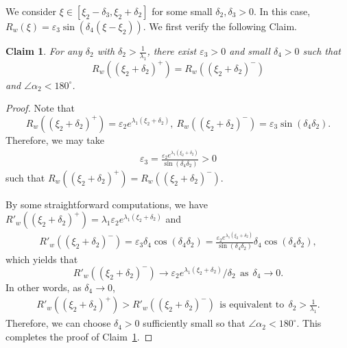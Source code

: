 \documentclass[11pt,a4paper]{article}
\newtheorem{claim}[theorem]{\textbf{Claim}}
\numberwithin{equation}{section}
\numberwithin{figure}{section}
\newcommand\bea{\begin{eqnarray}}
\newcommand\eea{\end{eqnarray}}
\newcommand\beaa{\begin{eqnarray*}}
\newcommand\eeaa{\end{eqnarray*}}
\begin{document}
\medskip





 We consider $\xi\in[\xi_2-\delta_3,\xi_2+\delta_2]$ for some small $\delta_2,\delta_3>0$. In this case, $R_w(\xi)=\varepsilon_3\sin(\delta_4(\xi-\xi_2))$.
We first verify the following Claim.
\begin{claim}\label{cl scalar}
For any $\delta_2$ with $\delta_2>\frac{1}{\lambda_1}$, there exist
$\varepsilon_3>0$ and small $\delta_4>0$
such that 
$$R_w((\xi_2+\delta_2)^+)=R_w((\xi_2+\delta_2)^-)$$ 
and $\angle\alpha_2<180^{\circ}$.
\end{claim}
\begin{proof}
Note that 
$$R_w((\xi_2+\delta_2)^+)=\varepsilon_2e^{\lambda_1(\xi_2+\delta_2)},\ R_w((\xi_2+\delta_2)^-)=\varepsilon_3\sin(\delta_4\delta_2).$$
Therefore, we may take
\bea\label{epsilon 3}
\varepsilon_3= \frac{\varepsilon_2e^{\lambda_1(\xi_2+\delta_2)}}{\sin(\delta_4\delta_2)}>0
\eea
such that $R_w((\xi_2+\delta_2)^+)=R_w((\xi_2+\delta_2)^-)$.

By some  straightforward computations, we have
$R'_w((\xi_2+\delta_2)^+)=\lambda_1\varepsilon_2e^{\lambda_1(\xi_2+\delta_2)}$ and
\beaa
R'_w((\xi_2+\delta_2)^-)=\varepsilon_3\delta_4\cos(\delta_4\delta_2)=\frac{\varepsilon_2e^{\lambda_1(\xi_2+\delta_2)}}{\sin(\delta_4\delta_2)}\delta_4\cos(\delta_4\delta_2),
\eeaa
which yields that
$$R'_w((\xi_2+\delta_2)^-)\rightarrow \varepsilon_2e^{\lambda_1(\xi_2+\delta_2)}/\delta_2\ \ \text{as}\ \ \delta_4\to0.$$
In other words, as $\delta_4\to0$,
\bea\label{delta 2}
R'_w((\xi_2+\delta_2)^+)>R'_w((\xi_2+\delta_2)^-)\ \ \text{is equivalent to}\ \ \delta_2>\frac{1}{\lambda_1}.
\eea
Therefore, we can choose $\delta_4>0$ sufficiently small so that $\angle\alpha_2<180^{\circ}$.
This completes the proof of Claim~\ref{cl scalar}.
\end{proof}
\end{document}
